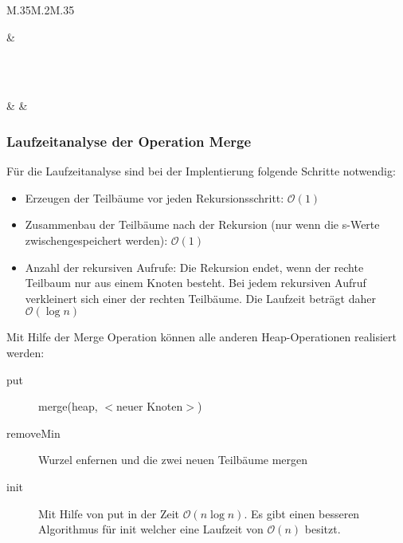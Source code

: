 \begin{tabular}{M{.35\textwidth}M{.2\textwidth}M{.35\textwidth}}
\begin{tikzpicture}[sibling distance=5mm]
				\edge[none];[.{} ]
			]
			\edge[none];[.{} ]
		];
	\end{tikzpicture}
	&
	\begin{tikzpicture}[sibling distance=3mm]
		\Tree [.\node[state]{3};
			[.\node[state]{5};
				[.\node[state]{7}; ]
				\edge[none];[.{} ]
			]
			[.\node[state]{4};
				[.\node[state]{6};
					[.\node[state]{8}; ]
					[.\node[state]{6}; ]
				]
				[.\node[state]{6};
					[.\node[state]{8}; ]
						\edge[none];[.{} ]
				]
			]
		];
	\end{tikzpicture}	\\
	 \\
	\begin{tikzpicture}[sibling distance=3mm]
		\Tree [.\node[state]{3};
			[.\node[state]{4};
				[.\node[state]{6};
					[.\node[state]{8}; ]
					[.\node[state]{6}; ]
				]
				[.\node[state]{6};
					[.\node[state]{8}; ]
						\edge[none];[.{} ]
				]
			]
			[.\node[state]{5};
				[.\node[state]{7}; ]
				\edge[none];[.{} ]
			]
		];
	\end{tikzpicture}
	&
	&
\end{tabular}

\newpage
\subsubsection{Laufzeitanalyse der Operation Merge}
Für die Laufzeitanalyse sind bei der Implentierung folgende Schritte notwendig:
\begin{itemize}
	\item Erzeugen der Teilbäume vor jeden Rekursionsschritt: \(\mathcal{O}(1)\)
	\item Zusammenbau der Teilbäume nach der Rekursion (nur wenn die s-Werte zwischengespeichert werden): \(\mathcal{O}(1)\)
	\item Anzahl der rekursiven Aufrufe: Die Rekursion endet, wenn der rechte Teilbaum nur aus einem Knoten besteht.
		Bei jedem rekursiven Aufruf verkleinert sich einer der rechten Teilbäume.
		Die Laufzeit beträgt daher \(\mathcal{O}(\log n)\)
\end{itemize}
Mit Hilfe der Merge Operation können alle anderen Heap-Operationen realisiert werden:
\begin{description}
	\item[put] merge(heap, \(<\)neuer Knoten\(>\))
	\item[removeMin] Wurzel enfernen und die zwei neuen Teilbäume mergen
	\item[init] Mit Hilfe von put in der Zeit \(\mathcal{O}(n \log n)\). Es gibt einen besseren Algorithmus für init welcher eine Laufzeit von \(\mathcal{O}(n)\) besitzt.
\end{description}

